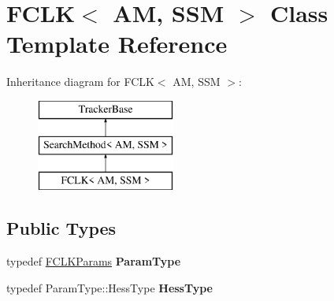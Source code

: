 \hypertarget{classFCLK}{\section{F\-C\-L\-K$<$ A\-M, S\-S\-M $>$ Class Template Reference}
\label{classFCLK}
}
Inheritance diagram for F\-C\-L\-K$<$ A\-M, S\-S\-M $>$\-:\begin{figure}[H]
\begin{center}
\leavevmode
\includegraphics[height=3.000000cm]{classFCLK}
\end{center}
\end{figure}
\subsection*{Public Types}
\begin{DoxyCompactItemize}
\item 
\hypertarget{classFCLK_a1287e06bf398f08c3b14dc00d0097e29}{typedef \hyperlink{structFCLKParams}{F\-C\-L\-K\-Params} {\bfseries Param\-Type}}\label{classFCLK_a1287e06bf398f08c3b14dc00d0097e29}

\item 
\hypertarget{classFCLK_a4934faeb78685cf910d63485c2c0430a}{typedef Param\-Type\-::\-Hess\-Type {\bfseries Hess\-Type}}\label{classFCLK_a4934faeb78685cf910d63485c2c0430a}

\end{DoxyCompactItemize}
